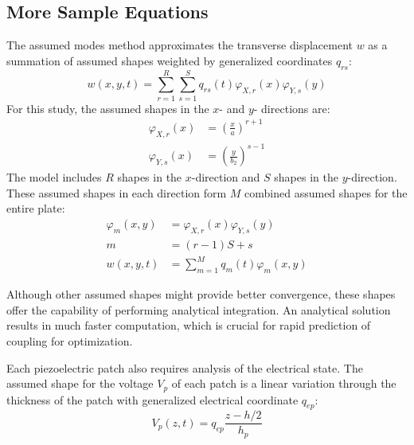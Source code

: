 \documentclass[thesis]{fputhesis}
\begin{document}
\begin{body}
\begin{appendices}
\section{More Sample Equations}
The assumed modes method approximates the transverse displacement $w$ as a summation of assumed shapes weighted by generalized coordinates $q_{rs}$:
\begin{equation}
w(x,y,t)=\sum_{r=1}^R \sum_{s=1}^S q_{rs}(t) \varphi_{X,r}(x) \varphi_{Y,s}(y)
\end{equation}
For this study, the assumed shapes in the $x$- and $y$- directions are:
\begin{align}
\varphi_{X,r}(x) &=\left(\frac{x}{a}\right)^{r+1} \\
\varphi_{Y,s}(x) &=\left(\frac{y}{b_2}\right)^{s-1}
\end{align}
The model includes $R$ shapes in the $x$-direction and $S$ shapes in the $y$-direction. These assumed shapes in each direction form $M$ combined assumed shapes for the entire plate:
\begin{align}
\varphi_m(x,y)&=\varphi_{X,r}(x) \varphi_{Y,s}(y) \\
m&=(r-1)S+s \label{meq} \\
w(x,y,t)&=\sum_{m=1}^M q_{m}(t) \varphi_{m}(x,y)
\end{align}



Although other assumed shapes might provide better convergence, these shapes offer the capability of performing analytical integration. An analytical solution results in much faster computation, which is crucial for rapid prediction of coupling for optimization. 

Each piezoelectric patch also requires analysis of the electrical state. The assumed shape for the voltage $V_p$ of each patch is a linear variation through the thickness of the patch with generalized electrical coordinate $q_{ep}$:
\begin{equation}
V_p(z,t) = q_{ep} \frac{z-h/2}{h_p}
\end{equation}



\end{appendices}
\end{body}
\end{document}
